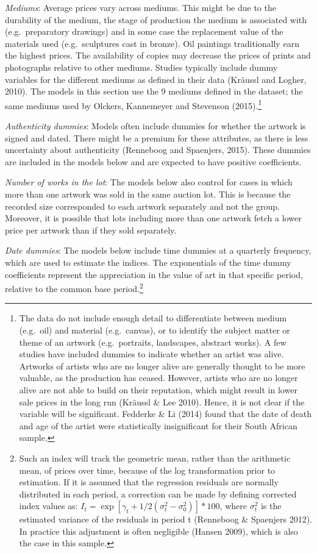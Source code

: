 \documentclass[12pt,]{article}
\let\rmarkdownfootnote\footnote%
\def\footnote{\protect\rmarkdownfootnote}
\begin{document}
\emph{Mediums}: Average prices vary across mediums. This might be due to
the durability of the medium, the stage of production the medium is
associated with (e.g.~preparatory drawings) and in some case the
replacement value of the materials used (e.g.~sculptures cast in
bronze). Oil paintings traditionally earn the highest prices. The
availability of copies may decrease the prices of prints and photographs
relative to other mediums. Studies typically include dummy variables for
the different mediums as defined in their data (Kräussl and Logher,
2010). The models in this section use the 9 mediums defined in the
dataset; the same mediums used by Olckers, Kannemeyer and Stevenson
(2015).\footnote{The data do not include enough detail to differentiate
  between medium (e.g.~oil) and material (e.g.~canvas), or to identify
  the subject matter or theme of an artwork (e.g.~portraits, landscapes,
  abstract works). A few studies have included dummies to indicate
  whether an artist was alive. Artworks of artists who are no longer
  alive are generally thought to be more valuable, as the production has
  ceased. However, artists who are no longer alive are not able to build
  on their reputation, which might result in lower sale prices in the
  long run (Kräussl \& Lee 2010). Hence, it is not clear if the variable
  will be significant. Fedderke \& Li (2014) found that the date of
  death and age of the artist were statistically insignificant for their
  South African sample.}

\emph{Authenticity dummies}: Models often include dummies for whether
the artwork is signed and dated. There might be a premium for these
attributes, as there is less uncertainty about authenticity (Renneboog
and Spaenjers, 2015). These dummies are included in the models below and
are expected to have positive coefficients.

\emph{Number of works in the lot}: The models below also control for
cases in which more than one artwork was sold in the same auction lot.
This is because the recorded size corresponded to each artwork
separately and not the group. Moreover, it is possible that lots
including more than one artwork fetch a lower price per artwork than if
they sold separately.

\emph{Date dummies}: The models below include time dummies at a
quarterly frequency, which are used to estimate the indices. The
exponentials of the time dummy coefficients represent the appreciation
in the value of art in that specific period, relative to the common base
period.\footnote{Such an index will track the geometric mean, rather
  than the arithmetic mean, of prices over time, because of the log
  transformation prior to estimation. If it is assumed that the
  regression residuals are normally distributed in each period, a
  correction can be made by defining corrected index values as:
  \(I_t =\exp\left[\gamma_t+ 1/2(\sigma_t^2-\sigma_0^2 )\right]*100\),
  where \(\sigma_t^2\) is the estimated variance of the residuals in
  period t (Renneboog \& Spaenjers 2012). In practice this adjustment is
  often negligible (Hansen 2009), which is also the case in this sample.}
\end{document}
